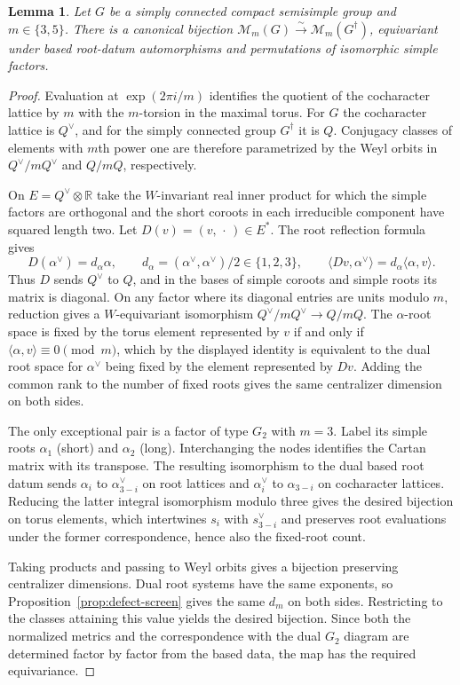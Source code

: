 \documentclass[11pt,a4paper,reqno]{amsart}
\theoremstyle{plain}
\newtheorem{lemma}[theorem]{Lemma}
\theoremstyle{definition}
\theoremstyle{remark}
\numberwithin{equation}{section}
\newcommand{\RR}{\mathbb R}
\newcommand{\cM}{\mathcal M}
\newcommand{\pair}[2]{\langle #1,#2\rangle}
\begin{document}
\begin{lemma}\label{lem:odd-local}
Let $G$ be a simply connected compact semisimple group and $m\in\{3,5\}$. There is a canonical bijection $\cM_m(G)\xrightarrow{\sim}\cM_m(G^\dagger)$, equivariant under based root-datum automorphisms and permutations of isomorphic simple factors.
\end{lemma}
\begin{proof}
Evaluation at $\exp(2\pi i/m)$ identifies the quotient of the cocharacter lattice by $m$ with the $m$-torsion in the maximal torus. For $G$ the cocharacter lattice is $Q^\vee$, and for the simply connected group $G^\dagger$ it is $Q$. Conjugacy classes of elements with $m$th power one are therefore parametrized by the Weyl orbits in $Q^\vee/mQ^\vee$ and $Q/mQ$, respectively.

On $E=Q^\vee\otimes\RR$ take the $W$-invariant real inner product for which the simple factors are orthogonal and the short coroots in each irreducible component have squared length two. Let $D(v)=(v,\,\cdot\,)\in E^*$. The root reflection formula gives
\[
D(\alpha^\vee)=d_\alpha\alpha,\qquad
d_\alpha=(\alpha^\vee,\alpha^\vee)/2\in\{1,2,3\},\qquad
\pair{Dv}{\alpha^\vee}=d_\alpha\pair{\alpha}{v}.
\]
Thus $D$ sends $Q^\vee$ to $Q$, and in the bases of simple coroots and simple roots its matrix is diagonal. On any factor where its diagonal entries are units modulo $m$, reduction gives a $W$-equivariant isomorphism $Q^\vee/mQ^\vee\to Q/mQ$. The $\alpha$-root space is fixed by the torus element represented by $v$ if and only if $\pair{\alpha}{v}\equiv0\pmod m$, which by the displayed identity is equivalent to the dual root space for $\alpha^\vee$ being fixed by the element represented by $Dv$. Adding the common rank to the number of fixed roots gives the same centralizer dimension on both sides.

The only exceptional pair is a factor of type $G_2$ with $m=3$. Label its simple roots $\alpha_1$ (short) and $\alpha_2$ (long). Interchanging the nodes identifies the Cartan matrix with its transpose. The resulting isomorphism to the dual based root datum sends $\alpha_i$ to $\alpha_{3-i}^\vee$ on root lattices and $\alpha_i^\vee$ to $\alpha_{3-i}$ on cocharacter lattices. Reducing the latter integral isomorphism modulo three gives the desired bijection on torus elements, which intertwines $s_i$ with $s_{3-i}^\vee$ and preserves root evaluations under the former correspondence, hence also the fixed-root count.

Taking products and passing to Weyl orbits gives a bijection preserving centralizer dimensions. Dual root systems have the same exponents, so Proposition~\ref{prop:defect-screen} gives the same $d_m$ on both sides. Restricting to the classes attaining this value yields the desired bijection. Since both the normalized metrics and the correspondence with the dual $G_2$ diagram are determined factor by factor from the based data, the map has the required equivariance.
\end{proof}
\end{document}
